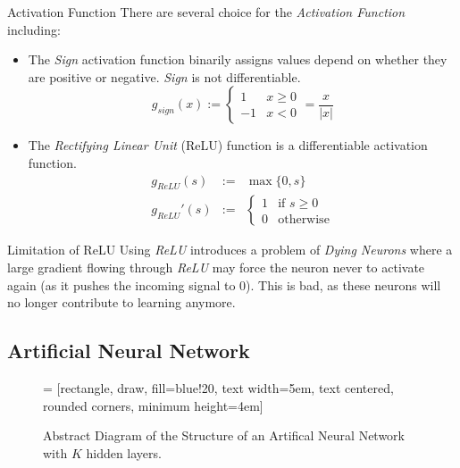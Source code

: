\documentclass[11pt,a4paper]{article}
\begin{document}
  \begin{proposition}{Activation Function}
    There are several choice for the \textit{Activation Function} including:
    \begin{itemize}
      \item The \textit{Sign} activation function binarily assigns values depend on whether they are positive or negative. \textit{Sign} is not differentiable.
      \[ g_{sign}(x):=\begin{cases}1&x\geq0\\-1&x<0\end{cases}=\frac{x}{|x|} \]

      \item The \textit{Rectifying Linear Unit} (ReLU) function is a differentiable activation function.
      \[\begin{array}{rcl}
          g_{ReLU}(s)&:=&\max\{0,s\}\\
          g_{ReLU}'(s)&:=&\begin{cases}1&\text{if }s\geq0\\0&\text{otherwise}\end{cases}
      \end{array}\]
    \end{itemize}
  \end{proposition}

  \begin{remark}{Limitation of ReLU}
    Using \textit{ReLU} introduces a problem of \textit{Dying Neurons} where a large gradient flowing through \textit{ReLU} may force the neuron never to activate again (as it pushes the incoming signal to 0). This is bad, as these neurons will no longer contribute to learning anymore.
  \end{remark}

\subsection{Artificial Neural Network} \label{sec_ArtificialNeuralNetwork}

  \begin{figure}[ht!]
    \centering
     = [rectangle, draw, fill=blue!20, text width=5em, text centered, rounded corners, minimum height=4em]
    \caption{Abstract Diagram of the Structure of an Artifical Neural Network with $K$ hidden layers.}
    \label{fig_ANN}
  \end{figure}
\end{document}
